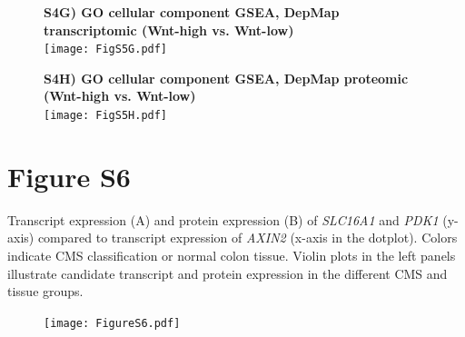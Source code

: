 \documentclass[11pt,a4paper,titlepage]{article}
\begin{document}
\begin{figure}[h!]
\textbf{S4G) GO cellular component GSEA, DepMap transcriptomic (Wnt-high vs. Wnt-low)}\\

\smallskip
\texttt{[image: FigS5G.pdf]} 
\end{figure}

\begin{figure}[h!]
\textbf{S4H) GO cellular component GSEA, DepMap proteomic (Wnt-high vs. Wnt-low)}\\

\smallskip
\texttt{[image: FigS5H.pdf]} 
\end{figure}


\clearpage

\section*{Figure S6}

Transcript expression (A) and protein expression (B) of \textit{SLC16A1} and \textit{PDK1} (y-axis) compared to transcript expression of \textit{AXIN2} (x-axis in the dotplot). Colors indicate CMS classification or normal colon tissue. Violin plots in the left panels illustrate candidate transcript and protein expression in the different CMS and tissue groups.

\begin{figure}[h]
\texttt{[image: FigureS6.pdf]} 

\end{figure}
\end{document}
